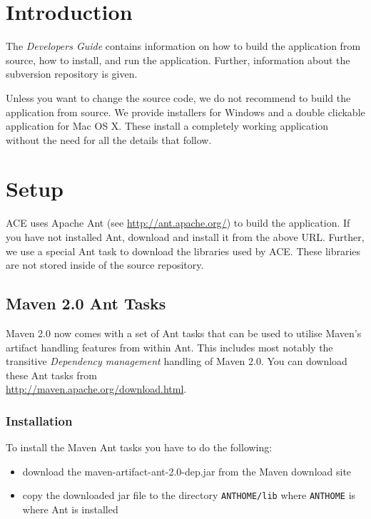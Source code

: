 \documentclass[11pt,a4paper]{article}
\begin{document}
\setlength{\parindent}{0pt}
\setlength{\parskip}{6pt}



\tableofcontents
\newpage


\section{Introduction}

The \emph{Developers Guide} contains information on how to build the application
from source, how to install, and run the application. Further, information
about the subversion repository is given.

Unless you want to change the source code, we do not recommend to build the
application from source. We provide installers for Windows and a double
clickable application for Mac OS X. These install a completely working
application without the need for all the details that follow.


\section{Setup}
ACE uses Apache Ant (see \href{http://ant.apache.org/}{http://ant.apache.org/})
to build the application. If you have not installed Ant, download and install
it from the above URL. Further, we use a special Ant task to download the
libraries used by ACE. These libraries are not stored inside of the source
repository.

\subsection{Maven 2.0 Ant Tasks}
Maven 2.0 now comes with a set of Ant tasks that can be used to utilise Maven's
artifact handling features from within Ant. This includes most notably the
transitive \emph{Dependency management} handling of Maven 2.0. You can
download these Ant tasks from \\
\href{http://maven.apache.org/download.html}{http://maven.apache.org/download.html}.

\subsubsection{Installation}
To install the Maven Ant tasks you have to do the following:
\begin{itemize}
 \item download the maven-artifact-ant-2.0-dep.jar from the Maven download site
 \item copy the downloaded jar file to the directory \texttt{ANTHOME/lib} where \texttt{ANTHOME} is where Ant is installed
\end{itemize}
\end{document}
